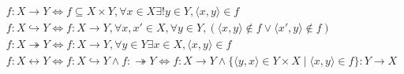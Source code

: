 



\begin{align*}
	& f : X \to Y
	\iff f \subseteq X \times Y,
	\forall x \in X \exists ! y \in Y, \langle x, y \rangle \in f \\
	& f : X \hookrightarrow Y
	\iff f : X \to Y, \forall x, x' \in X, \forall y \in Y, (\langle x, y \rangle \notin f \lor \langle x', y \rangle \notin f) \\
	& f : X \twoheadrightarrow Y
	\iff f : X \to Y, \forall y \in Y \exists x \in X, \langle x, y \rangle \in f \\
	& f : X \leftrightarrow Y
	\iff f : X \hookrightarrow Y \land f : \twoheadrightarrow Y
	\iff f : X \to Y \land \{ \langle y, x \rangle \in Y \times X \mid \langle x, y \rangle \in f \} : Y \to X
\end{align*}


